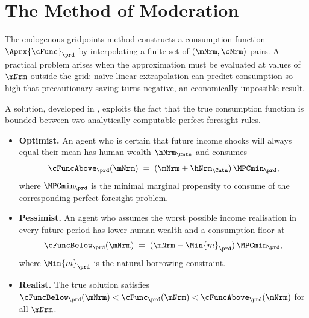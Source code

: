 \hypertarget{method-of-moderation}{}
\section{The Method of Moderation}\label{sec:method-of-moderation}

The endogenous gridpoints method constructs a consumption function
$\Aprx{\cFunc}_{\prd}$ by interpolating a finite set of
$(\mNrm,\cNrm)$ pairs.  A practical problem arises when the
approximation must be evaluated at values of $\mNrm$ outside the
grid: na\"ive linear extrapolation can predict consumption so high
that precautionary saving turns negative, an economically impossible
result.

A solution, developed in \cite{method-of-moderation}, exploits the fact that the
true consumption function is bounded between two analytically
computable perfect-foresight rules.
\begin{itemize}
  \item \textbf{Optimist.} An agent who is certain that future income
  shocks will always equal their mean has human wealth
  $\hNrm_{\Cntn}$ and consumes
  \begin{equation}
    \cFuncAbove_{\prd}(\mNrm) \;=\;
      (\mNrm + \hNrm_{\Cntn})\,\MPCmin_{\prd},
      \label{eq:cFuncAboveBrief}
  \end{equation}
  where $\MPCmin_{\prd}$ is the minimal marginal propensity to
  consume of the corresponding perfect-foresight problem.
  \item \textbf{Pessimist.} An agent who assumes the worst possible
  income realisation in every future period has lower human wealth and
  a consumption floor at
  \begin{equation}
    \cFuncBelow_{\prd}(\mNrm) \;=\;
      (\mNrm - \Min{m}_{\prd})\,\MPCmin_{\prd},
      \label{eq:cFuncBelowBrief}
  \end{equation}
  where $\Min{m}_{\prd}$ is the natural borrowing constraint.
  \item \textbf{Realist.}  The true solution satisfies
  $\cFuncBelow_{\prd}(\mNrm) < \cFunc_{\prd}(\mNrm) <
  \cFuncAbove_{\prd}(\mNrm)$ for all $\mNrm$.
\end{itemize}

